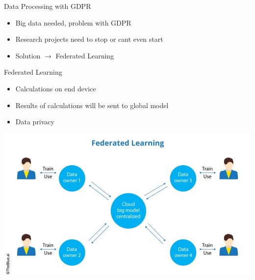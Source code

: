 \documentclass{beamer}{}
\begin{document}
    \begin{frame} {Data Processing with GDPR}
        \begin{itemize}[<+->]
           \item Big data needed, problem with GDPR
           \item Research projects need to stop or cant even start
           \item Solution $\rightarrow$ Federated Learning
        \end{itemize}        
    \end{frame}
    \begin{frame} {Federated Learning}
        \begin{itemize}[<+->]
           \item Calculations on end device
           \item Results of calculations will be sent to global model
           \item Data privacy
        \end{itemize}        
       \includegraphics[width=\textwidth]{img/federated-learning.png}%
    \end{frame}
\end{document}
